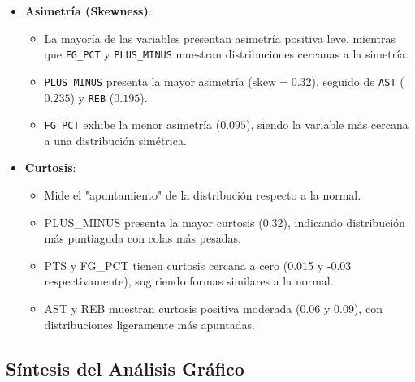 \documentclass[12pt]{article}
\begin{document}
\begin{itemize}
    \item \textbf{Asimetría (Skewness)}:
    \begin{itemize}
        \item La mayoría de las variables presentan asimetría positiva leve, mientras que \texttt{FG\_PCT} y \texttt{PLUS\_MINUS} muestran distribuciones cercanas a la simetría.
        \item \texttt{PLUS\_MINUS} presenta la mayor asimetría ($\text{skew} = 0.32$), seguido de \texttt{AST} ($0.235$) y \texttt{REB} ($0.195$).
        \item \texttt{FG\_PCT} exhibe la menor asimetría ($0.095$), siendo la variable más cercana a una distribución simétrica.
    \end{itemize}

    
    \item \textbf{Curtosis}: 
    \begin{itemize}
        \item Mide el "apuntamiento" de la distribución respecto a la normal.
        \item PLUS\_MINUS presenta la mayor curtosis (0.32), indicando distribución más puntiaguda con colas más pesadas.
        \item PTS y FG\_PCT tienen curtosis cercana a cero (0.015 y -0.03 respectivamente), sugiriendo formas similares a la normal.
        \item AST y REB muestran curtosis positiva moderada (0.06 y 0.09), con distribuciones ligeramente más apuntadas.
    \end{itemize}
\end{itemize}

\subsection{Síntesis del Análisis Gráfico}
\end{document}
